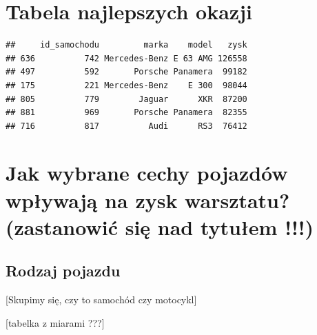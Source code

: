 \documentclass{article}\usepackage[]{graphicx}\usepackage[]{xcolor}
\makeatletter
\newenvironment{kframe}{%
 \def\at@end@of@kframe{}%
 \ifinner\ifhmode%
  \def\at@end@of@kframe{\end{minipage}}%
  \begin{minipage}{\columnwidth}%
 \fi\fi%
 \def\FrameCommand##1{\hskip\@totalleftmargin \hskip-\fboxsep
 \colorbox{shadecolor}{##1}\hskip-\fboxsep
     \hskip-\linewidth \hskip-\@totalleftmargin \hskip\columnwidth}%
 \MakeFramed {\advance\hsize-\width
   \@totalleftmargin\z@ \linewidth\hsize
   \@setminipage}}%
 {\par\unskip\endMakeFramed%
 \at@end@of@kframe}
\newenvironment{knitrout}{}{} %
\makeatother
\begin{document}
\section{Tabela najlepszych okazji}





\begin{knitrout}
\color{fgcolor}\begin{kframe}
\begin{verbatim}
##     id_samochodu         marka    model   zysk
## 636          742 Mercedes-Benz E 63 AMG 126558
## 497          592       Porsche Panamera  99182
## 175          221 Mercedes-Benz    E 300  98044
## 805          779        Jaguar      XKR  87200
## 881          969       Porsche Panamera  82355
## 716          817          Audi      RS3  76412
\end{verbatim}
\end{kframe}
\end{knitrout}

\section{Jak wybrane cechy pojazdów wpływają na zysk warsztatu? (zastanowić się nad tytułem !!!)}

\subsection{Rodzaj pojazdu}

{\color{red}[Skupimy się, czy to samochód czy motocykl]}

[tabelka z miarami ???]
\end{document}
